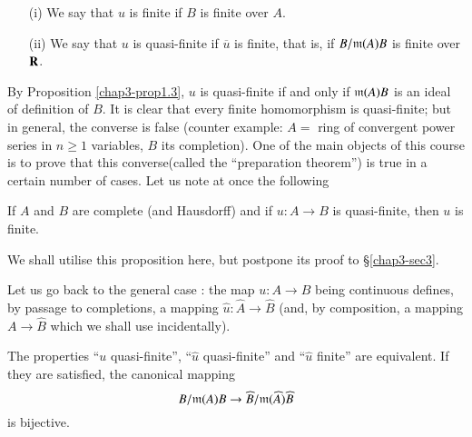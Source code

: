 \begin{definition}\label{chap3-defi1.4}
\begin{itemize}
\item[(i)] We say that $u$ is finite if $B$ is finite over $A$. 

\item[(ii)] We say that $u$ is quasi-finite if $\overline{u}$ is finite, that is, if $B/\mathfrak{m}(A)B$ is finite over $\mathbf{R}$.
\end{itemize}
\end{definition}

By Proposition \ref{chap3-prop1.3}, $u$ is quasi-finite if and only if $\mathfrak{m}(A)B$ is an ideal of definition of $B$. It is clear that every finite homomorphism is quasi-finite; but in general, the converse is false (counter example: $A=$ ring of convergent power series in $n\geq 1$ variables, $B$ its completion). One of the main objects of this course is to prove that this converse\pageoriginale (called the ``preparation theorem'') is true in a certain number of cases. Let us note at once the following

\begin{proposition}\label{chap3-prop1.5}
If $A$ and $B$ are complete (and Hausdorff) and if $u:A\to B$ is quasi-finite, then $u$ is finite.
\end{proposition}

We shall utilise this proposition here, but postpone its proof to \S\ref{chap3-sec3}.

Let us go back to the general case : the map $u:A\to B$ being continuous defines, by passage to completions, a mapping $\widehat{u}:\widehat{A}\to \widehat{B}$ (and, by composition, a mapping $A\to \widehat{B}$ which we shall use incidentally).

\begin{proposition}\label{chap3-prop1.6}
The properties ``$u$ quasi-finite'', ``$\widehat{u}$ quasi-finite'' and ``$\widehat{u}$ finite'' are equivalent. If they are satisfied, the canonical mapping
$$
B/\mathfrak{m}(A)B\to \widehat{B}/\mathfrak{m}(\widehat{A})\widehat{B}
$$
is bijective.
\end{proposition}

